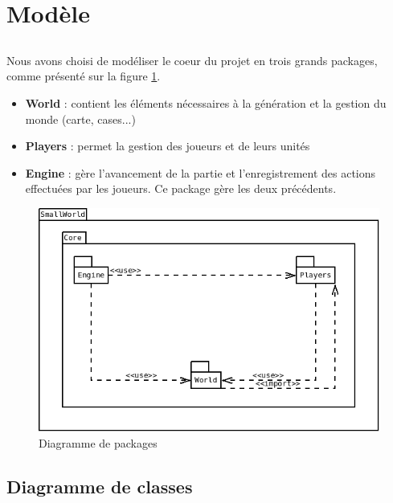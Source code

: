 \section{Modèle}

\subsection*{}

\paragraph{}
Nous avons choisi de modéliser le coeur du projet en trois grands packages, comme présenté sur la figure \ref{fig:packages}.

\begin{itemize}
  \item \textbf{World} : contient les éléments nécessaires à la génération et la gestion du monde (carte, cases...)
  \item \textbf{Players} : permet la gestion des joueurs et de leurs unités
  \item \textbf{Engine} : gère l'avancement de la partie et l'enregistrement des actions effectuées par les joueurs. Ce package gère les deux précédents.
\end{itemize}

\begin{figure}[h]
  \centering
  \includegraphics[width=13cm]{schemas/packages.png}
  \caption{Diagramme de packages}
  \label{fig:packages}
\end{figure}

\subsection{Diagramme de classes}

